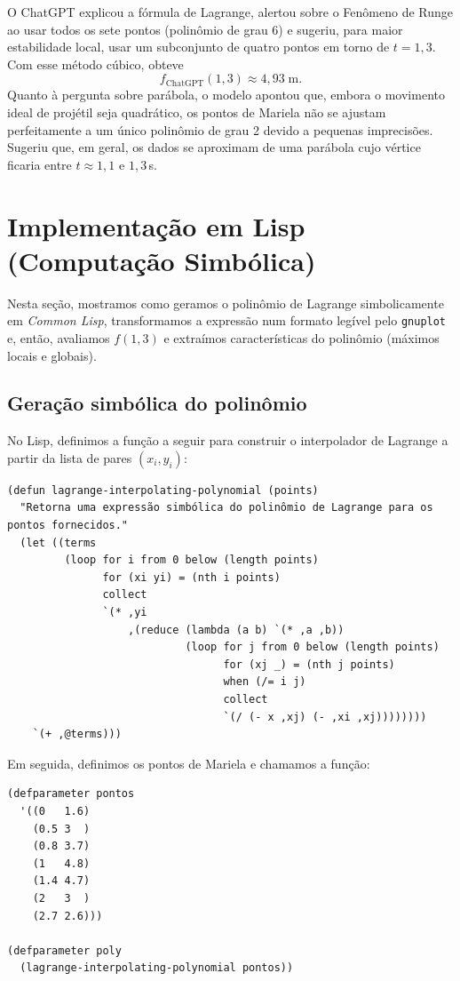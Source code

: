 \documentclass{article}
\begin{document}
O ChatGPT explicou a fórmula de Lagrange, alertou sobre o Fenômeno de Runge ao usar todos os sete pontos (polinômio de grau 6) e sugeriu, para maior estabilidade local, usar um subconjunto de quatro pontos em torno de $t=1{,}3$. Com esse método cúbico, obteve
\[
f_{\mathrm{ChatGPT}}(1{,}3) \approx 4{,}93\;\text{m}.
\]
Quanto à pergunta sobre parábola, o modelo apontou que, embora o movimento ideal de projétil seja quadrático, os pontos de Mariela não se ajustam perfeitamente a um único polinômio de grau 2 devido a pequenas imprecisões. Sugeriu que, em geral, os dados se aproximam de uma parábola cujo vértice ficaria entre $t \approx 1{,}1$ e $1{,}3$\,s.

\section{Implementação em Lisp (Computação Simbólica)}
Nesta seção, mostramos como geramos o polinômio de Lagrange simbolicamente em \textit{Common Lisp}, transformamos a expressão num formato legível pelo \texttt{gnuplot} e, então, avaliamos $f(1{,}3)$ e extraímos características do polinômio (máximos locais e globais).

\subsection{Geração simbólica do polinômio}
No Lisp, definimos a função a seguir para construir o interpolador de Lagrange a partir da lista de pares $(x_i, y_i)$:
\begin{verbatim}
(defun lagrange-interpolating-polynomial (points)
  "Retorna uma expressão simbólica do polinômio de Lagrange para os pontos fornecidos."
  (let ((terms
         (loop for i from 0 below (length points)
               for (xi yi) = (nth i points)
               collect
               `(* ,yi
                   ,(reduce (lambda (a b) `(* ,a ,b))
                            (loop for j from 0 below (length points)
                                  for (xj _) = (nth j points)
                                  when (/= i j)
                                  collect
                                  `(/ (- x ,xj) (- ,xi ,xj))))))))
    `(+ ,@terms)))
\end{verbatim}

Em seguida, definimos os pontos de Mariela e chamamos a função:
\begin{verbatim}
(defparameter pontos
  '((0   1.6)
    (0.5 3  )
    (0.8 3.7)
    (1   4.8)
    (1.4 4.7)
    (2   3  )
    (2.7 2.6)))

(defparameter poly
  (lagrange-interpolating-polynomial pontos))
\end{verbatim}
\end{document}
